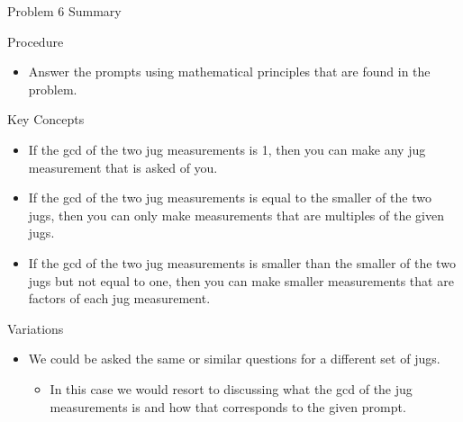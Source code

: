 \begin{summary}{Problem 6 Summary}
    \begin{statement}{Procedure}
        \begin{itemize}
            \item Answer the prompts using mathematical principles that are found in the problem.
        \end{itemize}
    \end{statement}
    \begin{statement}{Key Concepts}
        \begin{itemize}
            \item If the gcd of the two jug measurements is 1, then you can make any jug measurement that is asked of you.
            \item If the gcd of the two jug measurements is equal to the smaller of the two jugs, then you can only make measurements that are multiples of the given jugs.
            \item If the gcd of the two jug measurements is smaller than the smaller of the two jugs but not equal to one, then you can make smaller measurements that are factors of each jug measurement.
        \end{itemize}
    \end{statement}
    \begin{statement}{Variations}
        \begin{itemize}
            \item We could be asked the same or similar questions for a different set of jugs.
            \begin{itemize}
                \item In this case we would resort to discussing what the gcd of the jug measurements is and how that corresponds to the given prompt.
            \end{itemize}
        \end{itemize}
    \end{statement}
\end{summary}

